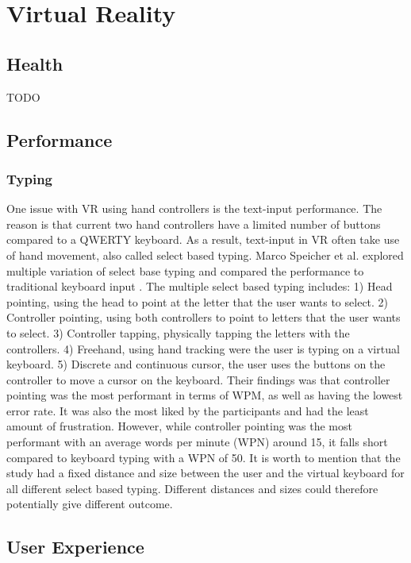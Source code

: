 \documentclass{sigchi}
\begin{document}
\section{Virtual Reality}

\subsection{Health}
TODO

\subsection{Performance}

\subsubsection{Typing}
One issue with VR using hand controllers is the text-input performance. The reason is that current two hand controllers have a limited number of buttons compared to a QWERTY keyboard. As a result, text-input in VR often take use of hand movement, also called select based typing. Marco Speicher et al. explored multiple variation of select base typing and compared the performance to traditional keyboard input \cite{speicher_selection-based_2018}. The multiple select based typing includes: 1) Head pointing, using the head to point at the letter that the user wants to select. 2) Controller pointing, using both controllers to point to letters that the user wants to select. 3) Controller tapping, physically tapping the letters with the controllers. 4) Freehand, using hand tracking were the user is typing on a virtual keyboard. 5) Discrete and continuous cursor, the user uses the buttons on the controller to move a cursor on the keyboard. Their findings was that controller pointing was the most performant in terms of WPM, as well as having the lowest error rate. It was also the most liked by the participants and had the least amount of frustration. However, while controller pointing was the most performant with an average words per minute (WPN) around 15, it falls short compared to keyboard typing with a WPN of 50. It is worth to mention that the study had a fixed distance and size between the user and the virtual keyboard for all different select based typing. Different distances and sizes could therefore potentially give different outcome.

\subsection{User Experience}
\end{document}
